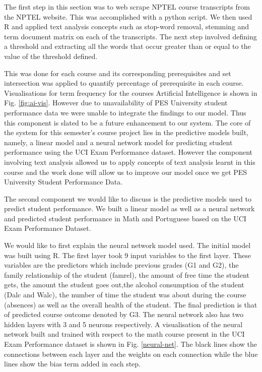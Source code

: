 \documentclass[conference]{IEEEtran}
\begin{document}
The first step in this section was to web scrape NPTEL course transcripts from the
NPTEL website. This was accomplished with a python script. We then used R and applied 
text analysis concepts such as stop-word removal, stemming and term document matrix 
on each of the transcripts. The next step involved defining a threshold and extracting 
all the words that occur greater than or equal to the value of the threshold defined.

This was done for each course and its corresponding prerequisites and set intersection
was applied to quantify percentage of prerequisite in each course. Visualisations for
term frequency for the courses Artificial Intelligence is shown in Fig. \ref{fig:ai-vis}.
However due to unavailability of PES University student performance data we were
unable to integrate the findings to our model. Thus this component is slated to be a future
enhancement to our system. The core of the system for this semester’s course project
lies in the predictive models built, namely, a linear model and a neural network
model for predicting student performance using the UCI Exam Performance dataset.
However the component involving text analysis allowed us to apply concepts of text
analysis learnt in this course and the work done will allow us to improve our model once
we get PES University Student Performance Data.

The second component we would like to discuss is the predictive models used to predict
student performance. We built a linear model as well as a neural network and
predicted student performance in Math and Portuguese based on the UCI Exam
Performance Dataset\cite{Lichman:2013}\cite{ref:4}.

We would like to first explain the neural network model used. The initial model was built
using R. The first layer took 9 input variables to the first layer. These variables are the
predictors which include previous grades (G1 and G2), the family relationship of the
student (famrel), the amount of free time the student gets, the amount the student goes
out,the alcohol consumption of the student (Dalc and Walc), the number of time the
student was about during the course (absences) as well as the overall health of the
student. The final prediction is that of predicted course outcome denoted by G3.
The neural network also has two hidden layers with 3 and 5 neurons respectively. A
visualisation of the neural network built and trained with respect to the math course
present in the UCI Exam Performance dataset is shown in Fig. \ref{neural-net}.
The black lines show the connections between each layer and the weights on each
connection while the blue lines show the bias term added in each step.
\end{document}
